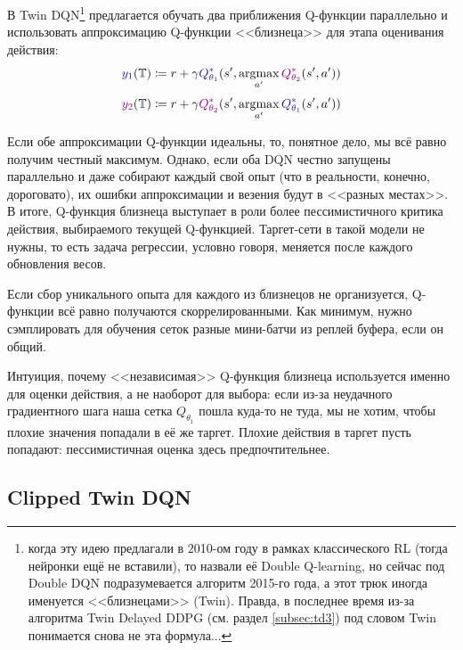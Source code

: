 В Twin DQN\footnote{когда эту идею предлагали в 2010-ом году в рамках классического RL (тогда нейронки ещё не вставили), то назвали её Double Q-learning, но сейчас под Double DQN подразумевается алгоритм 2015-го года, а этот трюк иногда именуется <<близнецами>> (Twin). Правда, в последнее время из-за алгоритма Twin Delayed DDPG (см. раздел \ref{subsec:td3}) под словом Twin понимается снова не эта формула...} предлагается обучать два приближения Q-функции параллельно и использовать аппроксимацию Q-функции <<близнеца>> для этапа оценивания действия:
$$\textcolor{ChadBlue}{y_1}(\T ) \coloneqq r + \gamma \textcolor{ChadBlue}{Q_{\theta_1}^*}(s', \argmax\limits_{a'} \textcolor{ChadPurple}{Q_{\theta_2}^*}(s', a'))$$
$$\textcolor{ChadPurple}{y_2}(\T ) \coloneqq r + \gamma \textcolor{ChadPurple}{Q_{\theta_2}^*}(s', \argmax\limits_{a'} \textcolor{ChadBlue}{Q_{\theta_1}^*}(s', a'))$$

Если обе аппроксимации Q-функции идеальны, то, понятное дело, мы всё равно получим честный максимум. Однако, если оба DQN честно запущены параллельно и даже собирают каждый свой опыт (что в реальности, конечно, дороговато), их ошибки аппроксимации и везения будут в <<разных местах>>. В итоге, Q-функция близнеца выступает в роли более пессимистичного критика действия, выбираемого текущей Q-функцией. Таргет-сети в такой модели не нужны, то есть задача регрессии, условно говоря, меняется после каждого обновления весов.

\begin{remark}
Если сбор уникального опыта для каждого из близнецов не организуется, Q-функции всё равно получаются скоррелированными. Как минимум, нужно сэмплировать для обучения сеток разные мини-батчи из реплей буфера, если он общий.
\end{remark}

Интуиция, почему <<независимая>> Q-функция близнеца используется именно для оценки действия, а не наоборот для выбора: если из-за неудачного градиентного шага наша сетка $Q_{\theta_1}$ пошла куда-то не туда, мы не хотим, чтобы плохие значения попадали в её же таргет. Плохие действия в таргет пусть попадают: пессимистичная оценка здесь предпочтительнее.

\subsection{Clipped Twin DQN}\label{subsec:clippedtwin}

